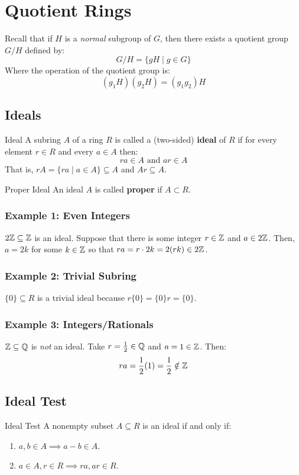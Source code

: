 \documentclass[letterpaper]{article}
\begin{document}
\section{Quotient Rings}
Recall that if $H$ is a \emph{normal} subgroup of $G$, then there exists a quotient group $G / H$ defined by: 
\[G / H = \{gH \mid g \in G\}\]
Where the operation of the quotient group is: 
\[(g_1 H)(g_2 H) = (g_1 g_2) H\]

\subsection{Ideals}
\begin{definition}{Ideal}{}
    A subring $A$ of a ring $R$ is called a (two-sided) \textbf{ideal} of $R$ if for every element $r \in R$ and every $a \in A$ then: 
    \[ra \in A \text{ and } ar \in A\]
    That is, $rA = \{ra \mid a \in A\} \subseteq A$ and $Ar \subseteq A$. 
\end{definition}

\begin{definition}{Proper Ideal}{}
    An ideal $A$ is called \textbf{proper} if $A \subset R$. 
\end{definition}

\subsubsection{Example 1: Even Integers}
$2\mathbb{Z} \subseteq \mathbb{Z}$ is an ideal. Suppose that there is some integer $r \in \mathbb{Z}$ and $a \in 2\mathbb{Z}$. Then, $a = 2k$ for some $k \in \mathbb{Z}$ so that $ra = r \cdot 2k = 2(rk) \in 2\mathbb{Z}$. 

\subsubsection{Example 2: Trivial Subring}
$\{0\} \subseteq R$ is a trivial ideal because $r \{0\} = \{0\} r = \{0\}$.

\subsubsection{Example 3: Integers/Rationals}
$\mathbb{Z} \subseteq \mathbb{Q}$ is \emph{not} an ideal. Take $r = \frac{1}{2} \in \mathbb{Q}$ and $a = 1 \in \mathbb{Z}$. Then:
\[ra = \frac{1}{2} (1) = \frac{1}{2} \notin \mathbb{Z}\]

\subsection{Ideal Test}
\begin{theorem}{Ideal Test}{}
    A nonempty subset $A \subseteq R$ is an ideal if and only if: 
    \begin{enumerate}
        \item $a, b \in A \implies a - b \in A$.
        \item $a \in A, r \in R \implies ra, ar \in R$.
    \end{enumerate}
\end{theorem}
\end{document}

